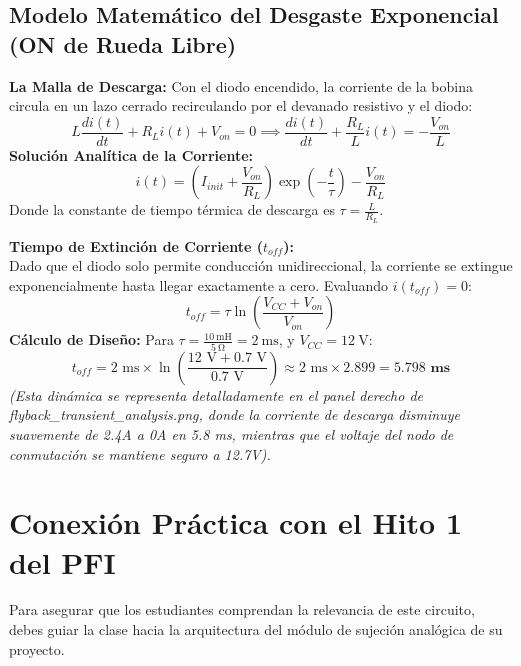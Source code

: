 \documentclass[11pt, a4paper]{article}
\begin{document}
\subsection*{Modelo Matemático del Desgaste Exponencial (ON de Rueda Libre)}
\textbf{La Malla de Descarga:} Con el diodo encendido, la corriente de la bobina circula en un lazo cerrado recirculando por el devanado resistivo y el diodo:
\begin{equation}
    L \frac{di(t)}{dt} + R_L i(t) + V_{on} = 0 \implies \frac{di(t)}{dt} + \frac{R_L}{L}i(t) = -\frac{V_{on}}{L}
\end{equation}
\textbf{Solución Analítica de la Corriente:}
\begin{equation}
    i(t) = \left( I_{init} + \frac{V_{on}}{R_L} \right) \exp\left( -\frac{t}{\tau} \right) - \frac{V_{on}}{R_L}
\end{equation}
Donde la constante de tiempo térmica de descarga es $\tau = \frac{L}{R_L}$.

\textbf{Tiempo de Extinción de Corriente ($t_{off}$):}\\
Dado que el diodo solo permite conducción unidireccional, la corriente se extingue exponencialmente hasta llegar exactamente a cero. Evaluando $i(t_{off}) = 0$:
\begin{equation}
    t_{off} = \tau \ln\left( \frac{V_{CC} + V_{on}}{V_{on}} \right)
\end{equation}
\textbf{Cálculo de Diseño:} Para $\tau = \frac{\qty{10}{\milli\henry}}{\qty{5}{\ohm}} = \qty{2}{\milli\second}$, y $V_{CC} = \qty{12}{\volt}$:
\begin{equation}
    t_{off} = 2\text{ ms} \times \ln\left( \frac{12\text{ V} + 0.7\text{ V}}{0.7\text{ V}} \right) \approx 2\text{ ms} \times 2.899 = \mathbf{5.798\text{ ms}}
\end{equation}
\textit{(Esta dinámica se representa detalladamente en el panel derecho de flyback\_transient\_analysis.png, donde la corriente de descarga disminuye suavemente de 2.4A a 0A en 5.8 ms, mientras que el voltaje del nodo de conmutación se mantiene seguro a 12.7V).}

\newpage
\section{Conexión Práctica con el Hito 1 del PFI}
Para asegurar que los estudiantes comprendan la relevancia de este circuito, debes guiar la clase hacia la arquitectura del módulo de sujeción analógica de su proyecto.
\end{document}
